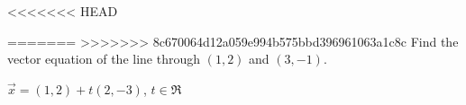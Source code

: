 
\begin{Exercise}[
name={},
title={}, 
difficulty=0,
origin={\cite{SM}}]
<<<<<<< HEAD

=======
>>>>>>> 8c670064d12a059e994b575bbd396961063a1c8c
Find the vector equation of the line through $(1,2)$ and $(3,-1)$.

\end{Exercise}

\begin{Answer}
$\vec{x} = (1,2)+t(2,-3)$, $t\in\Re$
\end{Answer}
